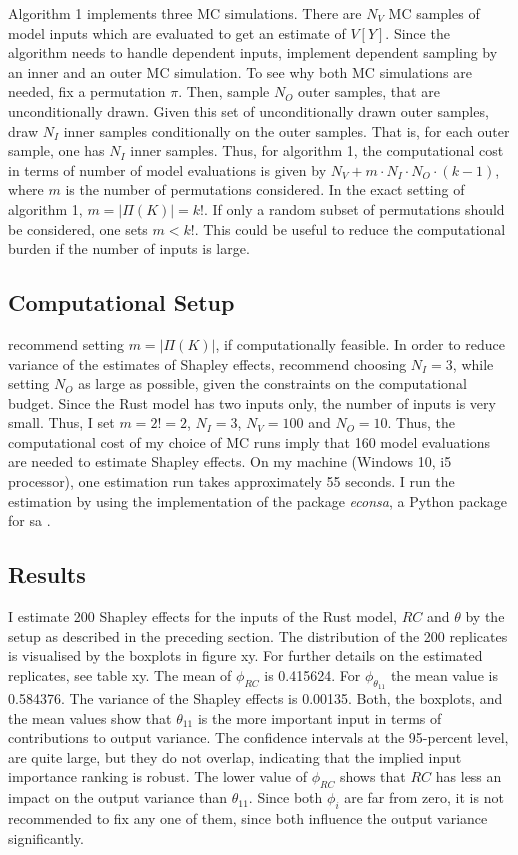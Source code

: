 Algorithm 1 implements three MC simulations. There are $N_V$ MC samples of model inputs which are evaluated to get an estimate of $V[Y]$. Since the algorithm needs to handle dependent inputs, \citet{SNS16} implement dependent sampling by an inner and an outer MC simulation. To see why both MC simulations are needed, fix a permutation $\pi$. Then, sample $N_O$ outer samples, that are unconditionally drawn. Given this set of unconditionally drawn outer samples, draw $N_I$ inner samples conditionally on the outer samples. That is, for each outer sample, one has $N_I$ inner samples. Thus, for algorithm 1, the computational cost in terms of number of model evaluations is given by $N_V+m \cdot N_I \cdot N_O \cdot (k-1)$, where $m$ is the number of permutations considered. In the exact setting of algorithm 1, $m=\vert \Pi(K) \vert=k!$. If only a random subset of permutations should be considered, one sets $m<k!$. This could be useful to reduce the computational burden if the number of inputs is large.

\subsection{Computational Setup}

\citet{SNS16} recommend setting $m=\vert \Pi(K) \vert$, if computationally feasible. In order to reduce variance of the estimates of Shapley effects, \citet{SNS16} recommend choosing $N_I=3$, while setting $N_O$ as large as possible, given the constraints on the computational budget. Since the Rust model has two inputs only, the number of inputs is very small. Thus, I set $m=2!=2$, $N_I=3$, $N_V=100$ and $N_O=10$. Thus, the computational cost of my choice of MC runs imply that 160 model evaluations are needed to estimate Shapley effects. On my machine (Windows 10, i5 processor), one estimation run takes approximately 55 seconds. I run the estimation by using the implementation of the package \textit{econsa}, a Python package for sa \citep{OSE21}.

\subsection{Results}

I estimate 200 Shapley effects for the inputs of the Rust model, $RC$ and $\theta$ by the setup as described in the preceding section. The distribution of the 200 replicates is visualised by the boxplots in figure xy. For further details on the estimated replicates, see table xy. The mean of $\phi_{RC}$ is 0.415624. For $\phi_{\theta_{11}}$ the mean value is 0.584376. The variance of the Shapley effects is 0.00135.
Both, the boxplots, and the mean values show that $\theta_{11}$ is the more important input in terms of contributions to output variance. The confidence intervals at the 95-percent level, are quite large, but they do not overlap, indicating that the implied input importance ranking is robust. The lower value of $\phi_{RC}$ shows that $RC$ has less an impact on the output variance than $\theta_{11}$. Since both $\phi_i$ are far from zero, it is not recommended to fix any one of them, since both influence the output variance significantly.
